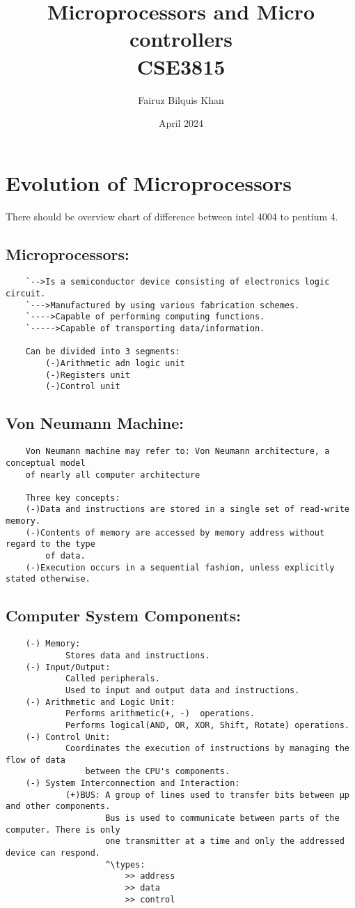 \documentclass{article}
\title{Microprocessors and Micro controllers \\ CSE3815}
\author{Fairuz Bilquis Khan}
\date{April 2024}
\begin{document}
\maketitle
\newpage
\section*{Evolution of Microprocessors}
There should be overview chart of difference between intel 4004 to pentium 4.
\newpage
\subsection*{Microprocessors:}
\begin{verbatim}
    `-->Is a semiconductor device consisting of electronics logic circuit.
    `--->Manufactured by using various fabrication schemes.
    `---->Capable of performing computing functions.
    `----->Capable of transporting data/information.

    Can be divided into 3 segments:
        (-)Arithmetic adn logic unit
        (-)Registers unit
        (-)Control unit
\end{verbatim}

\subsection*{Von Neumann Machine:}
\begin{verbatim}
    Von Neumann machine may refer to: Von Neumann architecture, a conceptual model
    of nearly all computer architecture

    Three key concepts:
    (-)Data and instructions are stored in a single set of read-write memory.
    (-)Contents of memory are accessed by memory address without regard to the type
        of data.
    (-)Execution occurs in a sequential fashion, unless explicitly stated otherwise.
\end{verbatim}

\subsection*{Computer System Components:}
\begin{verbatim}
    (-) Memory:
            Stores data and instructions.
    (-) Input/Output:
            Called peripherals.
            Used to input and output data and instructions.
    (-) Arithmetic and Logic Unit:
            Performs arithmetic(+, -)  operations.
            Performs logical(AND, OR, XOR, Shift, Rotate) operations.
    (-) Control Unit:
            Coordinates the execution of instructions by managing the flow of data 
                between the CPU's components.
    (-) System Interconnection and Interaction:
            (+)BUS: A group of lines used to transfer bits between µp and other components.
                    Bus is used to communicate between parts of the computer. There is only
                    one transmitter at a time and only the addressed device can respond.
                    ^\types:
                        >> address
                        >> data
                        >> control
   
        \end{verbatim}
\newpage
\end{document}
